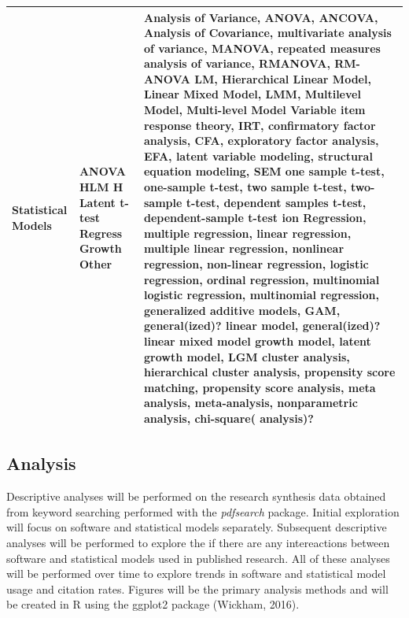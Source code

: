 \documentclass[english,,man]{apa6}
\theoremstyle{definition}
\theoremstyle{definition}
\theoremstyle{definition}
\theoremstyle{remark}
\begin{document}
\begin{longtable}[]{@{}lll@{}}
\begin{minipage}[t]{0.20\columnwidth}\raggedright
Statistical Models\strut
\end{minipage} & \begin{minipage}[t]{0.10\columnwidth}\raggedright
ANOVA HLM \textbar{} H Latent t-test Regress Growth Other\strut
\end{minipage} & \begin{minipage}[t]{0.37\columnwidth}\raggedright
Analysis of Variance, ANOVA, ANCOVA, Analysis of Covariance,
multivariate analysis of variance, MANOVA, repeated measures analysis of
variance, RMANOVA, RM-ANOVA LM, Hierarchical Linear Model, Linear Mixed
Model, LMM, Multilevel Model, Multi-level Model Variable \textbar{} item
response theory, IRT, confirmatory factor analysis, CFA, exploratory
factor analysis, EFA, latent variable modeling, structural equation
modeling, SEM \textbar{} one sample t-test, one-sample t-test, two
sample t-test, two-sample t-test, dependent samples t-test,
dependent-sample t-test ion \textbar{} Regression, multiple regression,
linear regression, multiple linear regression, nonlinear regression,
non-linear regression, logistic regression, ordinal regression,
multinomial logistic regression, multinomial regression, generalized
additive models, GAM, general(ized)? linear model, general(ized)? linear
mixed model \textbar{} growth model, latent growth model, LGM cluster
analysis, hierarchical cluster analysis, propensity score matching,
propensity score analysis, meta analysis, meta-analysis, nonparametric
analysis, chi-square( analysis)?\strut
\end{minipage}\tabularnewline
\bottomrule
\end{longtable}

\hypertarget{analysis}{%
\subsection{Analysis}\label{analysis}}

Descriptive analyses will be performed on the research synthesis data
obtained from keyword searching performed with the \emph{pdfsearch}
package. Initial exploration will focus on software and statistical
models separately. Subsequent descriptive analyses will be performed to
explore the if there are any intereactions between software and
statistical models used in published research. All of these analyses
will be performed over time to explore trends in software and
statistical model usage and citation rates. Figures will be the primary
analysis methods and will be created in R using the ggplot2 package
(Wickham, 2016).
\end{document}
